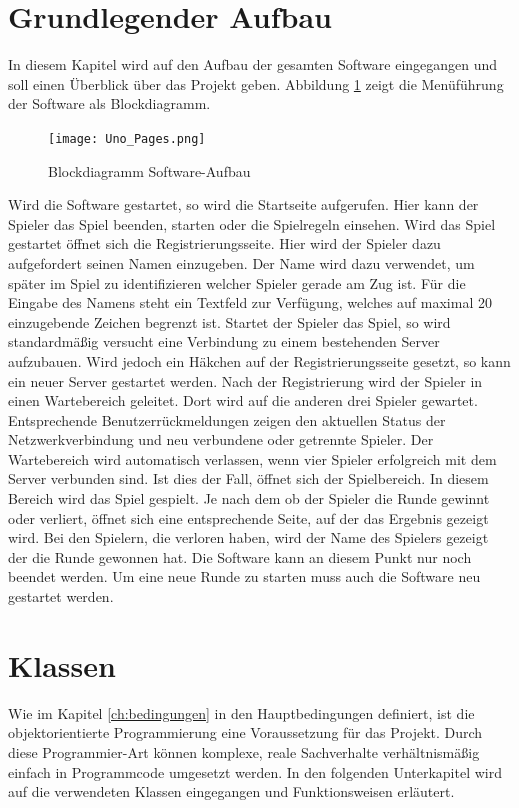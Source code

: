 \section{Grundlegender Aufbau}
In diesem Kapitel wird auf den Aufbau der gesamten Software eingegangen und soll einen Überblick über das Projekt geben. Abbildung \ref{fig:aufbau} zeigt die Menüführung der Software als Blockdiagramm. 
\begin{figure}[h]
	\begin{center}
		\texttt{[image: Uno\_Pages.png]}
		\caption{Blockdiagramm Software-Aufbau}
		\label{fig:aufbau}
	\end{center}
\end{figure}
Wird die Software gestartet, so wird die Startseite aufgerufen. Hier kann der Spieler das Spiel beenden, starten oder die Spielregeln einsehen. Wird das Spiel gestartet öffnet sich die Registrierungsseite. Hier wird der Spieler dazu aufgefordert seinen Namen einzugeben. Der Name wird dazu verwendet, um später im Spiel zu identifizieren welcher Spieler gerade am Zug ist. Für die Eingabe des Namens steht ein Textfeld zur Verfügung, welches auf maximal 20 einzugebende Zeichen begrenzt ist. Startet der Spieler das Spiel, so wird standardmäßig versucht eine Verbindung zu einem bestehenden Server aufzubauen. Wird jedoch ein Häkchen auf der Registrierungsseite gesetzt, so kann ein neuer Server gestartet werden. Nach der Registrierung wird der Spieler in einen Wartebereich geleitet. Dort wird auf die anderen drei Spieler gewartet. Entsprechende Benutzerrückmeldungen zeigen den aktuellen Status der Netzwerkverbindung und neu verbundene oder getrennte Spieler. Der Wartebereich wird automatisch verlassen, wenn vier Spieler erfolgreich mit dem Server verbunden sind. Ist dies der Fall, öffnet sich der Spielbereich. In diesem Bereich wird das Spiel gespielt. Je nach dem ob der Spieler die Runde gewinnt oder verliert, öffnet sich eine entsprechende Seite, auf der das Ergebnis gezeigt wird. Bei den Spielern, die verloren haben, wird der Name des Spielers gezeigt der die Runde gewonnen hat. Die Software kann an diesem Punkt nur noch beendet werden. Um eine neue Runde zu starten muss auch die Software neu gestartet werden.
\section{Klassen}
Wie im Kapitel \ref{ch:bedingungen} in den Hauptbedingungen definiert, ist die objektorientierte Programmierung eine Voraussetzung für das Projekt. Durch diese Programmier-Art können komplexe, reale Sachverhalte verhältnismäßig einfach in Programmcode umgesetzt werden. In den folgenden Unterkapitel wird auf die verwendeten Klassen eingegangen und Funktionsweisen erläutert.
